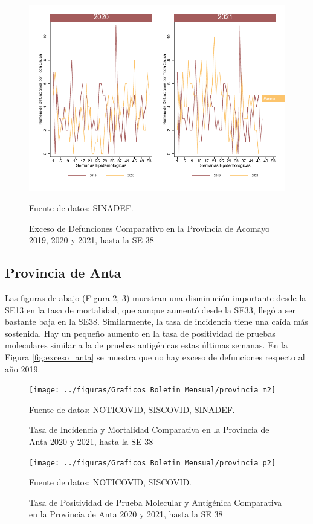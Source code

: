 \documentclass[12pt,a4paper,openany]{book}
\begin{document}
	\begin{figure}[h]
	\caption{Exceso de Defunciones Comparativo en la Provincia de Acomayo 2019, 2020 y 2021, hasta la SE 38}\label{fig:exceso_acomayo}
	\begin{center}
		\includegraphics[width=0.7\linewidth]{../figuras/exceso_1}
	\end{center}
	{\footnotesize {Fuente de datos: SINADEF.}}
	\end{figure}

	\clearpage
	
	\subsection*{Provincia de Anta}
	\noindent Las figuras de abajo (Figura \ref{fig:inc_mort_anta}, \ref{fig:positividad_anta})  muestran una disminución importante desde la SE13 en la tasa de mortalidad, que aunque aumentó desde la SE33, llegó a ser bastante baja en la SE38. Similarmente, la tasa de incidencia tiene una caída más sostenida. Hay un pequeño aumento en la tasa de positividad de pruebas moleculares similar a la de pruebas antigénicas estas últimas semanas. En la Figura \ref{fig:exceso_anta} se muestra que no hay exceso de defunciones respecto al año 2019.
	
		\begin{figure}[h]
		\caption{Tasa de Incidencia y Mortalidad Comparativa en la Provincia de Anta 2020 y 2021, hasta la SE 38}\label{fig:inc_mort_anta}
		\begin{center}
			\texttt{[image: ../figuras/Graficos Boletin Mensual/provincia\_m2]}
		\end{center}
		{\footnotesize {Fuente de datos: NOTICOVID, SISCOVID, SINADEF.}}
	\end{figure}
	
	\begin{figure}[h]
		\caption{Tasa de Positividad de Prueba Molecular y Antigénica Comparativa en la Provincia de Anta 2020 y 2021, hasta la SE 38}\label{fig:positividad_anta}
		\begin{center}
			\texttt{[image: ../figuras/Graficos Boletin Mensual/provincia\_p2]}
		\end{center}
		{\footnotesize {Fuente de datos: NOTICOVID, SISCOVID.}}
	\end{figure}
	
\end{document}
